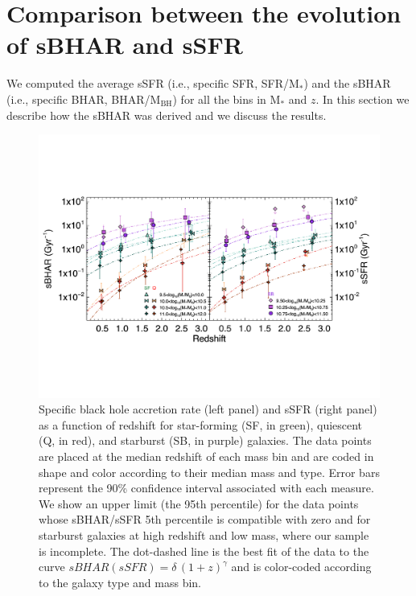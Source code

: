 \section{Comparison between the evolution of sBHAR and sSFR} \label{sec:specifics}
%
We computed the average sSFR (i.e., specific SFR, SFR/M$_*$) and the sBHAR (i.e., specific BHAR, BHAR/M$_\text{BH}$) for all the bins in M$_*$ and $z$. In this section we describe how the sBHAR was derived and we discuss the results.

   \begin{figure}
   \centering
   \includegraphics[trim={0 4cm 0.5cm 5.1cm}, clip,width=\textwidth]{Figs/sBHAR_all.pdf}
      \caption{ Specific black hole accretion rate (left panel) and sSFR (right panel) as a function of redshift for star-forming (SF, in green), quiescent (Q, in red), and starburst (SB, in purple) galaxies. The data points are placed at the median redshift of each mass bin and are coded in shape and color according to their median mass and type. Error bars represent the 90\% confidence interval associated with each measure. We show an upper limit (the 95th percentile) for the data points whose sBHAR/sSFR 5th percentile is compatible with zero and for starburst galaxies at high redshift and low mass, where our sample is incomplete. The dot-dashed line is the best fit of the data to the curve $sBHAR(sSFR)=\delta\, (1+z)^{\gamma}$ and is color-coded according to the galaxy type and mass bin.
              }
         \label{fig:sBHAR_all}
   \end{figure}
%
